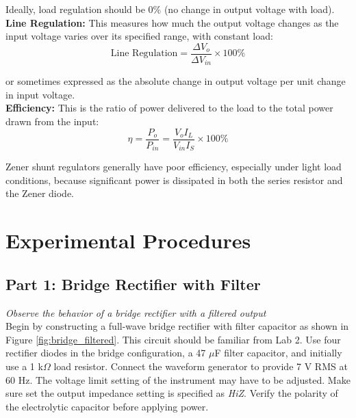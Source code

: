 \documentclass[10pt]{article}
\begin{document}
Ideally, load regulation should be 0\% (no change in output voltage with load).\\

\textbf{Line Regulation:} This measures how much the output voltage changes as the input voltage varies over its specified range, with constant load: \\

\begin{equation}
    \text{Line Regulation} = \frac{\Delta V_o}{\Delta V_{in}} \times 100\%
    \label{eq:line_reg}
\end{equation}

or sometimes expressed as the absolute change in output voltage per unit change in input voltage. \\

\textbf{Efficiency:} This is the ratio of power delivered to the load to the total power drawn from the input:\\

\begin{equation}
    \eta = \frac{P_o}{P_{in}} = \frac{V_o I_L}{V_{in} I_S} \times 100\%
    \label{eq:efficiency}
\end{equation}

Zener shunt regulators generally have poor efficiency, especially under light load conditions, because significant power is dissipated in both the series resistor and the Zener diode.\\

\section{Experimental Procedures}

\subsection{Part 1: Bridge Rectifier with Filter}
\emph{Observe the behavior of a bridge rectifier with a filtered output}\\

Begin by constructing a full-wave bridge rectifier with filter capacitor as shown in Figure \ref{fig:bridge_filtered}. This circuit should be familiar from Lab 2. Use four rectifier diodes in the bridge configuration, a 47 $\mu$F filter capacitor, and initially use a 1 k$\Omega$ load resistor. Connect the waveform generator to provide 7 V RMS at 60 Hz. The voltage limit setting of the instrument may have to be adjusted. Make sure set the output impedance setting is specified as \emph{HiZ}. Verify the polarity of the electrolytic capacitor before applying power.\\
\end{document}
